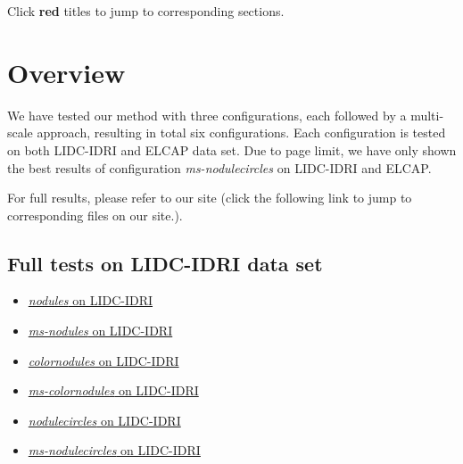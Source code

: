 \documentclass[onecolumn]{IEEEtran}
\begin{document}
\tableofcontents

\large{Click \textbf{red} titles to jump to corresponding sections. }
\newpage


\section{Overview}
We have tested our method with three configurations, each followed by a multi-scale approach, resulting in total six configurations. Each configuration is tested on both LIDC-IDRI and ELCAP data set. Due to page limit, we have only shown the best results of configuration \emph{ms-nodulecircles} on LIDC-IDRI and ELCAP.

For full results, please refer to our site (click the following link to jump to corresponding files on our site.).

\subsection{Full tests on LIDC-IDRI data set}
\begin{itemize}
\item \href{http://liu3xing3long.github.io/assets/papers/nodules.pdf}{\emph{nodules} on LIDC-IDRI}

\item \href{http://liu3xing3long.github.io/assets/papers/msnodules.pdf}{\emph{ms-nodules} on LIDC-IDRI}

\item \href{http://liu3xing3long.github.io/assets/papers/colornodules.pdf}{\emph{colornodules} on LIDC-IDRI}

\item \href{http://liu3xing3long.github.io/assets/papers/mscolornodules.pdf}{\emph{ms-colornodules} on LIDC-IDRI}

\item \href{http://liu3xing3long.github.io/assets/papers/nodulecircles.pdf}{\emph{nodulecircles} on LIDC-IDRI}

\item \href{http://liu3xing3long.github.io/assets/papers/msnodulecircles.pdf}{\emph{ms-nodulecircles} on LIDC-IDRI}
\end{itemize}
\end{document}
